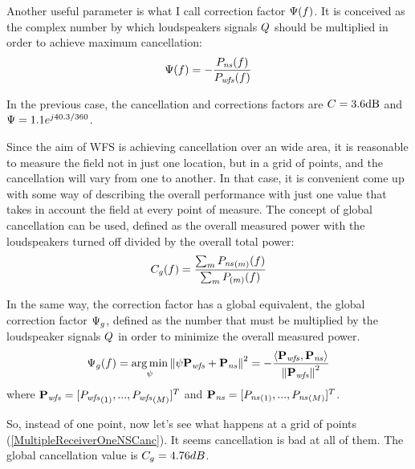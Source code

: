 Another useful parameter is what I call correction factor $\correctionFactor(f)$. It is conceived as the complex number by which loudspeakers signals $\signal[wfs][frequency]$ should be multiplied in order to achieve maximum cancellation:
\begin{equation}
\correctionFactor(f) = -\frac{\Field[ns][frequency](f)}{\Field[wfs][frequency](f)}
\end{equation}

In the previous case, the cancellation and corrections factors are $\cancellation = 3.6\si{dB}$ and $\correctionFactor = 1.1 e^{j40.3/360}$.

Since the aim of WFS is achieving cancellation over an wide area, it is reasonable to measure the field not in just one location, but in a grid of points, and the cancellation will vary from one to another. In that case, it is convenient come up with some way of describing the overall performance with just one value that takes in account the field at every point of measure. The concept of global cancellation can be used, defined as the overall measured power with the loudspeakers turned off divided by the overall total power:
\begin{equation}
\globalCancellation(f) = \frac{\sum_m \Field[ns][frequency][scalar][m](f)}{\sum_m \Field[total][frequency][scalar][m](f)}
\end{equation}

In the same way, the correction factor has a global equivalent, the global correction factor $\globalCorrectionFactor$, defined as the number that must be multiplied by the loudspeaker signals $\signal[wfs][frequency]$ in order to minimize the overall measured power.
\begin{equation}
\globalCorrectionFactor(f) = \argmin_{\psi} \norm{\psi \Field[wfs][frequency][vector] + \Field[ns][frequency][vector]}^2 = -\frac{\scalarProd{\Field[wfs][frequency][vector]}{\Field[ns][frequency][vector]}}{\norm{\Field[wfs][frequency][vector]}^2}
\end{equation}
where $\Field[wfs][frequency][vector] = [\Field[wfs][frequency][scalar][1],...,\Field[wfs][frequency][scalar][\numMeasPoints]]^T$ and $\Field[ns][frequency][vector] = [\Field[ns][frequency][scalar][1],...,\Field[ns][frequency][scalar][\numMeasPoints]]^T$.

So, instead of one point, now let's see what happens at a grid of points (\autoref{MultipleReceiverOneNSCanc}). It seems cancellation is bad at all of them. The global cancellation value is $\globalCancellation = 4.76 dB$. 

